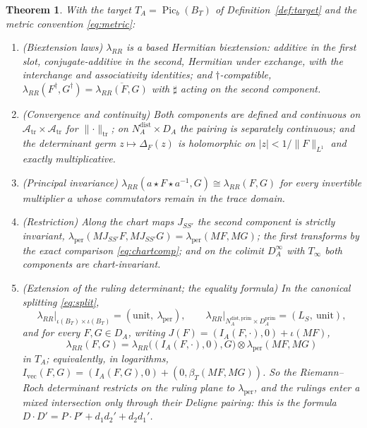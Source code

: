 \documentclass[11pt]{amsart}
\newtheorem{theorem}{Theorem}[section]
\theoremstyle{definition}
\theoremstyle{remark}
\newcommand{\Picb}{\operatorname{Pic}_{b}}
\newcommand{\DA}{D_A}
\newcommand{\Atr}{\mathcal A_{\mathrm{tr}}}
\newcommand{\BT}{B_T}
\newcommand{\NAd}{N_A^{\mathrm{dist}}}
\begin{document}
\begin{theorem}\label{thm:RR}
With the target $T_A=\Picb(\BT)$ of Definition~\ref{def:target} and the metric
convention \eqref{eq:metric}:
\begin{enumerate}
\item[(a)] \emph{(Biextension laws)}  $\lambda_{RR}$ is a based Hermitian
biextension: additive in the first slot, conjugate-additive in the second,
Hermitian under exchange, with the interchange and associativity identities;
and $\dagger$-compatible,
$\lambda_{RR}(F^{\dagger},G^{\dagger})=\overline{\lambda_{RR}(F,G)}$ with
$\sharp$ acting on the second component.
\item[(b)] \emph{(Convergence and continuity)}  Both components are defined and
continuous on $\Atr\times\Atr$ for $\lVert\cdot\rVert_{\mathrm{tr}}$; on
$\NAd\times\DA$ the pairing is separately continuous; and the determinant germ
$z\mapsto\Delta_F(z)$ is holomorphic on $|z|<1/\lVert F\rVert_{L^{1}}$ and
exactly multiplicative.
\item[(c)] \emph{(Principal invariance)}
$\lambda_{RR}(a\star F\star a^{-1},G)\cong\lambda_{RR}(F,G)$ for every
invertible multiplier $a$ whose commutators remain in the trace domain.
\item[(d)] \emph{(Restriction)}  Along the chart maps $J_{SS'}$ the second
component is strictly invariant,
$\lambda_{\mathrm{per}}(MJ_{SS'}F,MJ_{SS'}G)=\lambda_{\mathrm{per}}(MF,MG)$; the
first transforms by the exact comparison \eqref{eq:chartcomp}; and on the
colimit $\DA^{\infty}$ with $T_{\infty}$ both components are chart-invariant.
\item[(e)] \emph{(Extension of the ruling determinant; the equality formula)}
In the canonical splitting \eqref{eq:split},
\[
\lambda_{RR}\bigl|_{\iota(\BT)\times \iota(\BT)}=(\mathrm{unit},\ 
\lambda_{\mathrm{per}}),\qquad
\lambda_{RR}\bigl|_{N_A^{\mathrm{dist,prim}}\times\DA^{\mathrm{prim}}}
=(L_S,\ \mathrm{unit}),
\]
and for every $F,G\in\DA$, writing $J(F)=(I_A(F,\cdot),0)+\iota(MF)$,
\begin{equation}\label{eq:weilformula}
\lambda_{RR}(F,G)=\lambda_{RR}\bigl((I_A(F,\cdot),0),G\bigr)\otimes
\lambda_{\mathrm{per}}(MF,MG)
\end{equation}
in $T_A$; equivalently, in logarithms,
$I_{\mathrm{vec}}(F,G)=(I_A(F,G),0)+(0,\beta_T(MF,MG))$.  So the Riemann--Roch
determinant restricts on the ruling plane to $\lambda_{\mathrm{per}}$, and the
rulings enter a mixed intersection only through their Deligne pairing: this is
the formula $D\cdot D'=P\cdot P'+d_1d_2'+d_2d_1'$.

\end{enumerate}
\end{theorem}
\end{document}
